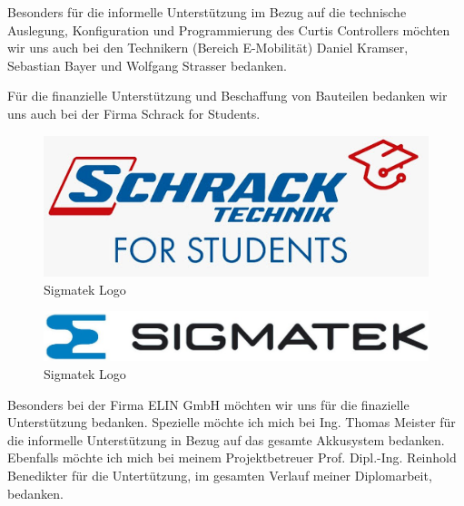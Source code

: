 Besonders für die informelle Unterstützung im Bezug auf die technische Auslegung, Konfiguration und Programmierung des Curtis Controllers möchten wir uns auch bei den Technikern (Bereich E-Mobilität) Daniel Kramser, Sebastian Bayer und Wolfgang Strasser bedanken.

Für die finanzielle Unterstützung und Beschaffung von Bauteilen bedanken wir uns auch bei der Firma Schrack for Students.

\begin{figure}[H]
	\begin{center}
		\includegraphics[scale=0.5]{figures/allgemein/Schrack_Logo.jpg}
		\caption{Sigmatek Logo}
	\end{center}
\end{figure}

\begin{figure}[H]
	\begin{center}
		\includegraphics[scale=0.5]{figures/allgemein/Sigmatek_LOGO.jpg}
		\caption{Sigmatek Logo}
	\end{center}
\end{figure}

\vspace{1cm}

Besonders bei der Firma ELIN GmbH möchten wir uns für die finazielle Unterstützung bedanken. Spezielle möchte ich mich bei Ing. Thomas Meister für die informelle Unterstützung in Bezug auf das gesamte Akkusystem bedanken.
Ebenfalls möchte ich mich bei meinem Projektbetreuer Prof. Dipl.-Ing. Reinhold Benedikter für die Untertützung, im gesamten Verlauf meiner Diplomarbeit, bedanken.

